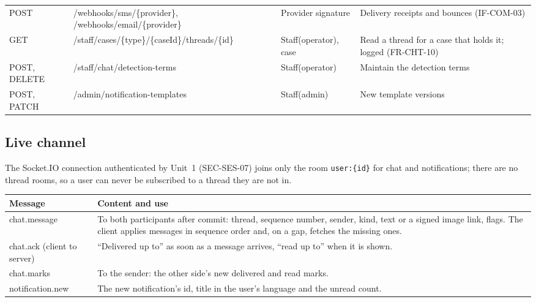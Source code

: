 \documentclass[11pt,a4paper]{article}
\newenvironment{dtable}[1]{\small\begin{longtable}{#1}}{\end{longtable}}
\begin{document}
{\begin{longtable}{@{}>{\ttfamily\raggedright\arraybackslash}p{1.55cm}>{\ttfamily\raggedright\arraybackslash}p{4.8cm}>{\raggedright\arraybackslash}p{2.4cm}>{\raggedright\arraybackslash}p{6.1cm}@{}}
POST & /\allowbreak webhooks/\allowbreak sms/\allowbreak \{provider\}, /\allowbreak webhooks/\allowbreak email/\allowbreak \{provider\} & Provider signature & Delivery receipts and bounces (IF-COM-03) \\
GET & /\allowbreak staff/\allowbreak cases/\allowbreak \{type\}/\allowbreak \{caseId\}/\allowbreak threads/\allowbreak \{id\} & Staff(operator), case & Read a thread for a case that holds it; logged (FR-CHT-10) \\
POST, DELETE & /\allowbreak staff/\allowbreak chat/\allowbreak detection-\allowbreak terms & Staff(operator) & Maintain the detection terms \\
POST, PATCH & /\allowbreak admin/\allowbreak notification-\allowbreak templates & Staff(admin) & New template versions \\
\bottomrule
\end{longtable}
}

\subsection{Live channel}
The Socket.IO connection authenticated by Unit~1 (SEC-SES-07) joins only the room \texttt{user:\{id\}} for chat and notifications; there are no thread rooms, so a user can never be subscribed to a thread they are not in.
\begin{dtable}{@{}>{\ttfamily}p{3.9cm}>{\raggedright\arraybackslash}p{11.3cm}@{}}
\toprule
\textnormal{\textbf{Message}} & \textbf{Content and use} \\ \midrule \endhead
chat.message & To both participants after commit: thread, sequence number, sender, kind, text or a signed image link, flags. The client applies messages in sequence order and, on a gap, fetches the missing ones. \\
chat.ack (client to server) & ``Delivered up to'' as soon as a message arrives, ``read up to'' when it is shown. \\
chat.marks & To the sender: the other side's new delivered and read marks. \\
notification.new & The new notification's id, title in the user's language and the unread count. \\
\bottomrule
\end{dtable}
\end{document}

